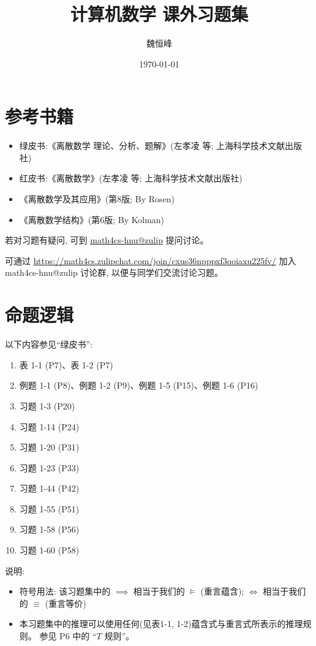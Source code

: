 \documentclass{article}
\title{计算机数学 课外习题集}
\author{魏恒峰}
\date{\today}
\begin{document}
\maketitle
\section*{参考书籍}

\begin{itemize}
  \item 绿皮书:《离散数学 理论、分析、题解》(左孝凌 等; 上海科学技术文献出版社)
  \item 红皮书:《离散数学》(左孝凌 等; 上海科学技术文献出版社)
  \item《离散数学及其应用》(第8版; By Rosen)
  \item《离散数学结构》(第6版; By Kolman)
\end{itemize}

若对习题有疑问, 可到 \href{https://math4cs.zulipchat.com/#narrow/channel/592978-Problem-Set-Plus}{math4cs-hnu@zulip} 提问讨论。

可通过 \url{https://math4cs.zulipchat.com/join/cxus36npppxf3qoiaxu225fv/}
加入 math4cs-hnu@zulip 讨论群, 以便与同学们交流讨论习题。
\section{命题逻辑}

以下内容参见``绿皮书'':
\begin{enumerate}[(1)]
  \item 表 1-1 (P7)、表 1-2 (P7)
  \item 例题 1-1 (P8)、例题 1-2 (P9)、例题 1-5 (P15)、例题 1-6 (P16)
  \item 习题 1-3 (P20)
  \item 习题 1-14 (P24)
  \item 习题 1-20 (P31)
  \item 习题 1-23 (P33)
  \item 习题 1-44 (P42)
  \item 习题 1-55 (P51)
  \item 习题 1-58 (P56)
  \item 习题 1-60 (P58)
\end{enumerate}

说明:
\begin{itemize}
  \item 符号用法: 该习题集中的 $\implies$ 相当于我们的 $\models$ (重言蕴含);
    $\iff$ 相当于我们的 $\equiv$ (重言等价)
  \item 本习题集中的推理可以使用任何(见表1-1, 1-2)蕴含式与重言式所表示的推理规则。
    参见 P6 中的 ``$T$ 规则''。
\end{itemize}
\end{document}
